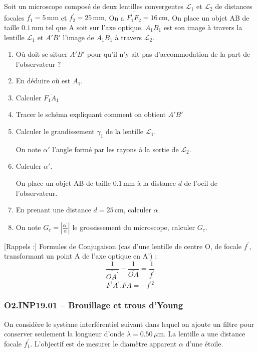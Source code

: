 Soit un microscope composé de deux lentilles convergentes $\mathcal{L}_{1}$ et $\mathcal{L}_{2}$ de distances focales $f_{1}^{'} = 5\,\text{mm}$ et $f_{2}^{'} = 25\,\text{mm}$. On a $\overline{F_{1}^{'}F_{2}} = 16\,\text{cm}$. On place un objet AB de taille $0.1\,\text{mm}$ tel que A soit sur l'axe optique. $A_{1}B_{1}$ est son image à travers la lentille $\mathcal{L}_{1}$ et $A'B'$ l'image de $A_{1}B_{1}$ à travers $\mathcal{L}_{2}$.

\begin{enumerate}
\item Où doit se situer $A'B'$ pour qu'il n'y ait pas d'accommodation de la part de l'observateur ?
\item En déduire où est $A_{1}$.
\item Calculer $\overline{F_{1}A_{1}}$
\item Tracer le schéma expliquant comment on obtient $A'B'$
\item Calculer le grandissement $\gamma_{1}$ de la lentille $\mathcal{L}_{1}$.

On note $\alpha'$ l'angle formé par les rayons à la sortie de $\mathcal{L}_{2}$.

\item Calculer $\alpha'$.

On place un objet AB de taille $0.1\,\text{mm}$ à la distance $d$ de l'oeil de l'observateur.

\item En prenant une distance $d = 25\,\text{cm}$, calculer $\alpha$.
\item On note $G_{c} = \left| \frac{\alpha^{'}}{\alpha} \right|$ le grossissement du microscope, calculer $G_{c}$.
\end{enumerate}

[Rappels :]
Formules de Conjugaison (cas d'une lentille de centre O, de focale $f^{'}$, transformant un point A de l'axe optique en A') :
$$\frac{1}{\overline{OA^{'}}} - \frac{1}{\overline{OA}} = \frac{1}{f^{'}}$$
$$\overline{F^{'}A^{'}}.\overline{FA} = - f^{'2}$$

\newpage
\subsubsection*{O2.INP19.01 -- Brouillage et trous d'Young  \indications}

On considère le système interférentiel suivant dans lequel on ajoute un filtre pour conserver seulement la longueur d'onde $\lambda = 0.50\,\mu\text{m}$. La lentille a une distance focale $f_{1}^{'}$. L'objectif est de mesurer le diamètre apparent $\alpha$ d'une étoile.

